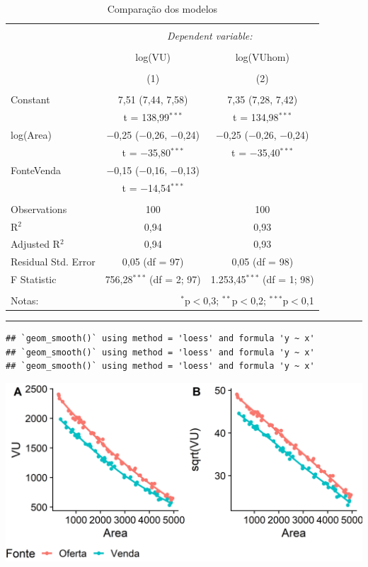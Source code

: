 \documentclass{article}
\begin{document}
\begin{table}[H] \centering 
  \caption{Comparação dos modelos} 
  \label{} 
\begin{tabular}{@{\extracolsep{5pt}}lcc} 
\\[-1.8ex]\hline 
\hline \\[-1.8ex] 
 & \multicolumn{2}{c}{\textit{Dependent variable:}} \\ 
\cline{2-3} 
\\[-1.8ex] & log(VU) & log(VUhom) \\ 
\\[-1.8ex] & (1) & (2)\\ 
\hline \\[-1.8ex] 
 Constant & 7,51 (7,44, 7,58) & 7,35 (7,28, 7,42) \\ 
  & t = 138,99$^{***}$ & t = 134,98$^{***}$ \\ 
  log(Area) & $-$0,25 ($-$0,26, $-$0,24) & $-$0,25 ($-$0,26, $-$0,24) \\ 
  & t = $-$35,80$^{***}$ & t = $-$35,40$^{***}$ \\ 
  FonteVenda & $-$0,15 ($-$0,16, $-$0,13) &  \\ 
  & t = $-$14,54$^{***}$ &  \\ 
 \hline \\[-1.8ex] 
Observations & 100 & 100 \\ 
R$^{2}$ & 0,94 & 0,93 \\ 
Adjusted R$^{2}$ & 0,94 & 0,93 \\ 
Residual Std. Error & 0,05 (df = 97) & 0,05 (df = 98) \\ 
F Statistic & 756,28$^{***}$ (df = 2; 97) & 1.253,45$^{***}$ (df = 1; 98) \\ 
\hline 
\hline \\[-1.8ex] 
Notas: & \multicolumn{2}{r}{$^{*}$p$<$0,3; $^{**}$p$<$0,2; $^{***}$p$<$0,1} \\ 
\end{tabular} 
\end{table}

\begin{center}\rule{0.5\linewidth}{0.5pt}\end{center}

\begin{verbatim}
## `geom_smooth()` using method = 'loess' and formula 'y ~ x'
## `geom_smooth()` using method = 'loess' and formula 'y ~ x'
## `geom_smooth()` using method = 'loess' and formula 'y ~ x'
\end{verbatim}

\includegraphics{./images/unnamed-chunk-32-1.png}
\end{document}
